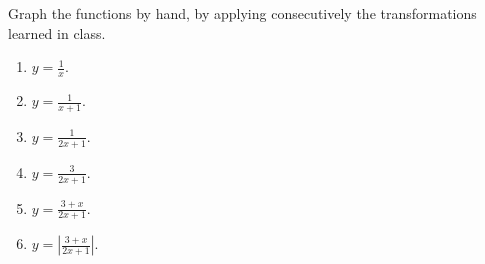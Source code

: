 \begin{problem}Graph the functions by hand, by applying consecutively the transformations learned in class.
\begin{multicols}{2}
\begin{enumerate}
\item $y=\frac{1}{x}$.
\item $y=\frac{1}{x+1}$.
\item $y=\frac{1}{2x+1}$.
\item $y=\frac{3}{2x+1}$.
\item $y=\frac{3+x}{2x+1}$.
\item $y=\left|\frac{3+x}{2x+1}\right|$.
\end{enumerate}
\end{multicols}
\end{problem}